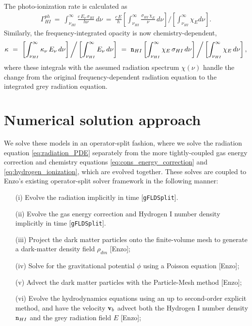 \documentclass[letterpaper,10pt]{article}
\renewcommand{\(}{\left(}
\renewcommand{\)}{\right)}
\newcommand{\vb}{{\bf v}_b}
\newcommand{\mn}{{\tt n}}
\begin{document}
The photo-ionization rate is calculated as
\begin{align}
  \label{eq:phHI}
  \Gamma_{HI}^{ph} \ = \ \int_{\nu_{HI}}^{\infty}
    \frac{c\,E_{\nu}\,\sigma_{HI}}{h\nu}\, d\nu 
  \ = \ \frac{c\,E}{h} 
    \left[\int_{\nu_{HI}}^{\infty} \frac{\sigma_{HI}\, \chi_E}{\nu}\,
      d\nu\right] \bigg/ \left[\int_{\nu_{HI}}^{\infty} \chi_E d\nu\right].
\end{align}
Similarly, the frequency-integrated opacity is now chemistry-dependent,
\begin{equation}
\label{eq:opacityHI}
  \kappa \ = \ 
  \left[\int_{\nu_{HI}}^{\infty} \kappa_{\nu}\,E_{\nu}\,d\nu\right] \bigg/
  \left[\int_{\nu_{HI}}^{\infty} E_{\nu}\,d\nu\right] \ = \ 
  \mn_{HI} \left[\int_{\nu_{HI}}^{\infty}
    \chi_E\,\sigma_{HI}\,d\nu\right] \bigg/
  \left[\int_{\nu_{HI}}^{\infty} \chi_E\,d\nu\right],
\end{equation}
where these integrals with the assumed radiation spectrum $\chi(\nu)$
handle the change from the original frequency-dependent radiation
equation to the integrated grey radiation equation.




\section{Numerical solution approach}
\label{sec:solution_approach}

We solve these models in an operator-split fashion, where we solve
the radiation equation \eqref{eq:radiation_PDE} separately from the
more tightly-coupled gas energy correction and chemistry equations
\eqref{eq:cons_energy_correction} and \eqref{eq:hydrogen_ionization},
which are evolved together.  These solves are coupled to Enzo's
existing operator-split solver framework in the following manner:
\begin{itemize}
\item[(i)] Evolve the radiation implicitly in time [{\tt gFLDSplit}].
\item[(ii)] Evolve the gas energy correction and Hydrogen I number
  density implicitly in time [{\tt gFLDSplit}]. 
\item[(iii)] Project the dark matter particles onto the finite-volume
  mesh to generate a dark-matter density field $\rho_{dm}$ [Enzo];
\item[(iv)] Solve for the gravitational potential $\phi$ using a
  Poisson equation [Enzo];
\item[(v)] Advect the dark matter particles with the Particle-Mesh
  method [Enzo];
\item[(vi)] Evolve the hydrodynamics equations using an up to
  second-order explicit method, and have the velocity $\vb$ advect
  both the Hydrogen I number density $\mn_{HI}$ and the grey radiation
  field $E$ [Enzo]; 
\end{itemize}
\end{document}
